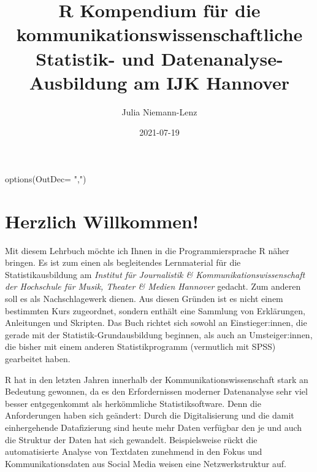 \documentclass[
]{book}
\title{R Kompendium für die kommunikationswissenschaftliche Statistik- und Datenanalyse-Ausbildung am IJK Hannover}
\author{Julia Niemann-Lenz}
\date{2021-07-19}
\newenvironment{Shaded}{\begin{snugshade}}{\end{snugshade}}
\newcommand{\AttributeTok}[1]{\textcolor[rgb]{0.77,0.63,0.00}{#1}}
\newcommand{\FunctionTok}[1]{\textcolor[rgb]{0.00,0.00,0.00}{#1}}
\newcommand{\NormalTok}[1]{#1}
\newcommand{\StringTok}[1]{\textcolor[rgb]{0.31,0.60,0.02}{#1}}
\begin{document}
\maketitle

{
\setcounter{tocdepth}{1}
\tableofcontents
}
\begin{Shaded}
\begin{Highlighting}[]
\FunctionTok{options}\NormalTok{(}\AttributeTok{OutDec=} \StringTok{","}\NormalTok{)}
\end{Highlighting}
\end{Shaded}

\hypertarget{herzlich-willkommen}{%
\chapter*{Herzlich Willkommen!}\label{herzlich-willkommen}}

Mit diesem Lehrbuch möchte ich Ihnen in die Programmiersprache R näher bringen. Es ist zum einen als begleitendes Lernmaterial für die Statistikausbildung am \emph{Institut für Journalistik \& Kommunikationswissenschaft der Hochschule für Musik, Theater \& Medien Hannover} gedacht. Zum anderen soll es als Nachschlagewerk dienen. Aus diesen Gründen ist es nicht einem bestimmten Kurs zugeordnet, sondern enthält eine Sammlung von Erklärungen, Anleitungen und Skripten. Das Buch richtet sich sowohl an Einstieger:innen, die gerade mit der Statistik-Grundausbildung beginnen, als auch an Umsteiger:innen, die bisher mit einem anderen Statistikprogramm (vermutlich mit SPSS) gearbeitet haben.

R hat in den letzten Jahren innerhalb der Kommunikationswissenschaft stark an Bedeutung gewonnen, da es den Erfordernissen moderner Datenanalyse sehr viel besser entgegenkommt als herkömmliche Statistiksoftware. Denn die Anforderungen haben sich geändert: Durch die Digitalisierung und die damit einhergehende Datafizierung sind heute mehr Daten verfügbar den je und auch die Struktur der Daten hat sich gewandelt. Beispielsweise rückt die automatisierte Analyse von Textdaten zunehmend in den Fokus und Kommunikationsdaten aus Social Media weisen eine Netzwerkstruktur auf.
\end{document}
